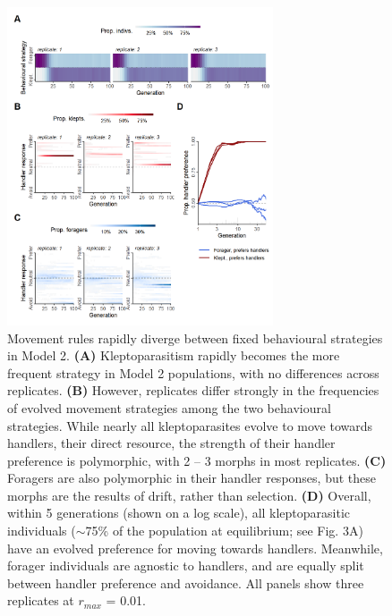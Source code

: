 \documentclass[11pt]{article}
\begin{document}
\begin{figure}[h!]
    \centering
    \includegraphics[width=0.70\textwidth]{figures/fig_07.png}
    \caption{
       Movement rules rapidly diverge between fixed behavioural strategies in Model 2.
       \textbf{(A)} Kleptoparasitism rapidly becomes the more frequent strategy in Model 2 populations, with no differences across replicates.
       \textbf{(B)} However, replicates differ strongly in the frequencies of evolved movement strategies among the two behavioural strategies.
       While nearly all kleptoparasites evolve to move towards handlers, their direct resource, the strength of their handler preference is polymorphic, with 2 -- 3 morphs in most replicates.
       \textbf{(C)} Foragers are also polymorphic in their handler responses, but these morphs are the results of drift, rather than selection.
       \textbf{(D)} Overall, within 5 generations (shown on a log scale), all kleptoparasitic individuals ($\sim$75\% of the population at equilibrium; see Fig. 3A) have an evolved preference for moving towards handlers.
       Meanwhile, forager individuals are agnostic to handlers, and are equally split between handler preference and avoidance.
       All panels show three replicates at $r_{max}$ = 0.01.
    }
    \label{Fig:Syndrome}
\end{figure}



\end{document}
